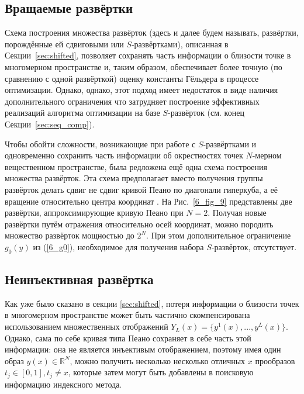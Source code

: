 \subsection{Вращаемые развёртки}
Схема построения множества развёрток (здесь и далее будем называть, развёртки, порождённые ей сдвиговыми
или $S$-развёртками), описанная в Секции~\ref{sec:shifted}, позволяет сохранять часть информации
о близости точке в многомерном пространстве и, таким образом, обеспечивает более точную (по сравнению с одной развёрткой)
оценку константы Гёльдера в процессе оптимизации. Однако, однако, этот подход имеет недостаток в виде наличия дополнительного ограничения
что затрудняет построение эффективных реализаций алгоритма оптимизации на базе $S$-развёрток (см. конец Секции~\ref{sec:seq_comp}).

Чтобы обойти сложности, возникающие при работе с $S$-развёртками и одновременно сохранить часть информации об окрестностях точек
$N$-мерном вещественном пространстве, была редложена ещё одна схема построения множества развёрток.
Эта схема предполагает вместо получения группы развёрток делать сдвиг не сдвиг кривой Пеано по диагонали гиперкуба, а
её вращение относительно центра координат \cite{Gergel2009}.
На Рис.~\ref{6_fig_9} представлены две развёртки, аппроксимирующие кривую Пеано при $N=2$.
Получая новые развёртки путём отражения относительно осей координат, можно породить множество развёрток
мощностью до $2^N$. При этом дополнительное ограничение $g_0(y)$ из (\ref{6_g0}), необходимое для получения
набора $S$-развёрток, отсутствует.

\subsection{Неинъективная развёртка}

Как уже было сказано в секции \ref{sec:shifted}, потеря информации о близости точек в многомерном
пространстве может быть частично скомпенсирована использованием множественных отображений $Y_L(x)=\{y^1(x),...,y^L(x)\}$.
Однако, сама по себе кривая типа Пеано сохраняет в себе часть этой информации: она не является инъективым отображением,
поэтому имея один образ $y(x)\in \mathbb{R}^N$, можно получить несколько несколько отличных $x$ прообразов $t_j\in[0,1], t_j \not = x$,
которые затем могут быть добавлены в поисковую информацию индексного метода.

